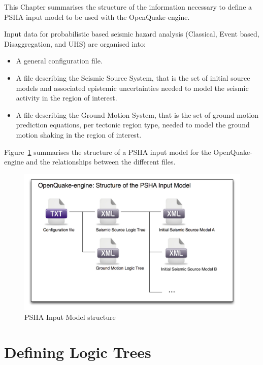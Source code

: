 This Chapter summarises the structure of the information necessary to define
a PSHA input model to be used with the OpenQuake-engine.

Input data for probabilistic based seismic hazard analysis (Classical, Event
based, Disaggregation, and UHS) are organised into:

\begin{itemize}

	\item A general configuration file.

    \item A file describing the Seismic Source System, that is the set of
	initial source models and associated epistemic uncertainties needed to
	model the seismic activity in the region of interest.

    \item A file describing the Ground Motion System, that is the set of
	ground motion prediction equations, per tectonic region type, needed to
	model the ground motion shaking in the region of interest.

\end{itemize}

Figure~\ref{fig:psha_input} summarises the structure of a PSHA input model
for the OpenQuake-engine and the relationships between the different files.

\begin{figure}[!ht]
\centering
\includegraphics[width=14cm]{figures/hazard/psha_input_structure.pdf}
\caption{PSHA Input Model structure}
\label{fig:psha_input}
\end{figure}


\section{Defining Logic Trees}

\label{sec:hazard_logic_trees}

